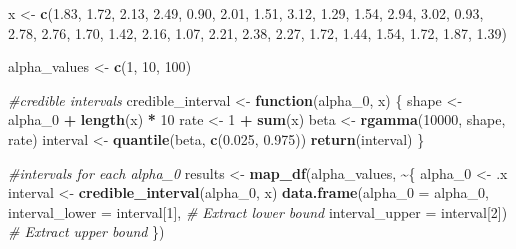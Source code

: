 \documentclass[
]{article}
\newenvironment{Shaded}{\begin{snugshade}}{\end{snugshade}}
\newcommand{\AttributeTok}[1]{\textcolor[rgb]{0.13,0.29,0.53}{#1}}
\newcommand{\CommentTok}[1]{\textcolor[rgb]{0.56,0.35,0.01}{\textit{#1}}}
\newcommand{\ControlFlowTok}[1]{\textcolor[rgb]{0.13,0.29,0.53}{\textbf{#1}}}
\newcommand{\DecValTok}[1]{\textcolor[rgb]{0.00,0.00,0.81}{#1}}
\newcommand{\FloatTok}[1]{\textcolor[rgb]{0.00,0.00,0.81}{#1}}
\newcommand{\FunctionTok}[1]{\textcolor[rgb]{0.13,0.29,0.53}{\textbf{#1}}}
\newcommand{\NormalTok}[1]{#1}
\newcommand{\OtherTok}[1]{\textcolor[rgb]{0.56,0.35,0.01}{#1}}
\newcommand{\SpecialCharTok}[1]{\textcolor[rgb]{0.81,0.36,0.00}{\textbf{#1}}}
\begin{document}
\begin{Shaded}
\begin{Highlighting}[]
\NormalTok{x }\OtherTok{\textless{}{-}} \FunctionTok{c}\NormalTok{(}\FloatTok{1.83}\NormalTok{, }\FloatTok{1.72}\NormalTok{, }\FloatTok{2.13}\NormalTok{, }\FloatTok{2.49}\NormalTok{, }\FloatTok{0.90}\NormalTok{, }\FloatTok{2.01}\NormalTok{, }\FloatTok{1.51}\NormalTok{, }\FloatTok{3.12}\NormalTok{, }\FloatTok{1.29}\NormalTok{, }\FloatTok{1.54}\NormalTok{,}
       \FloatTok{2.94}\NormalTok{, }\FloatTok{3.02}\NormalTok{, }\FloatTok{0.93}\NormalTok{, }\FloatTok{2.78}\NormalTok{, }\FloatTok{2.76}\NormalTok{, }\FloatTok{1.70}\NormalTok{, }\FloatTok{1.42}\NormalTok{, }\FloatTok{2.16}\NormalTok{, }\FloatTok{1.07}\NormalTok{, }\FloatTok{2.21}\NormalTok{,}
       \FloatTok{2.38}\NormalTok{, }\FloatTok{2.27}\NormalTok{, }\FloatTok{1.72}\NormalTok{, }\FloatTok{1.44}\NormalTok{, }\FloatTok{1.54}\NormalTok{, }\FloatTok{1.72}\NormalTok{, }\FloatTok{1.87}\NormalTok{, }\FloatTok{1.39}\NormalTok{)}

\NormalTok{alpha\_values }\OtherTok{\textless{}{-}} \FunctionTok{c}\NormalTok{(}\DecValTok{1}\NormalTok{, }\DecValTok{10}\NormalTok{, }\DecValTok{100}\NormalTok{)}

\CommentTok{\#credible intervals}
\NormalTok{credible\_interval }\OtherTok{\textless{}{-}} \ControlFlowTok{function}\NormalTok{(alpha\_0, x) \{}
\NormalTok{  shape }\OtherTok{\textless{}{-}}\NormalTok{ alpha\_0 }\SpecialCharTok{+} \FunctionTok{length}\NormalTok{(x) }\SpecialCharTok{*} \DecValTok{10}
\NormalTok{  rate }\OtherTok{\textless{}{-}} \DecValTok{1} \SpecialCharTok{+} \FunctionTok{sum}\NormalTok{(x)}
\NormalTok{  beta }\OtherTok{\textless{}{-}} \FunctionTok{rgamma}\NormalTok{(}\DecValTok{10000}\NormalTok{, shape, rate)}
\NormalTok{  interval }\OtherTok{\textless{}{-}} \FunctionTok{quantile}\NormalTok{(beta, }\FunctionTok{c}\NormalTok{(}\FloatTok{0.025}\NormalTok{, }\FloatTok{0.975}\NormalTok{))}
  \FunctionTok{return}\NormalTok{(interval)}
\NormalTok{\}}

\CommentTok{\#intervals for each alpha\_0}
\NormalTok{results }\OtherTok{\textless{}{-}} \FunctionTok{map\_df}\NormalTok{(alpha\_values, }\SpecialCharTok{\textasciitilde{}}\NormalTok{\{}
\NormalTok{  alpha\_0 }\OtherTok{\textless{}{-}}\NormalTok{ .x}
\NormalTok{  interval }\OtherTok{\textless{}{-}} \FunctionTok{credible\_interval}\NormalTok{(alpha\_0, x)}
  \FunctionTok{data.frame}\NormalTok{(}\AttributeTok{alpha\_0 =}\NormalTok{ alpha\_0, }
             \AttributeTok{interval\_lower =}\NormalTok{ interval[}\DecValTok{1}\NormalTok{],  }\CommentTok{\# Extract lower bound}
             \AttributeTok{interval\_upper =}\NormalTok{ interval[}\DecValTok{2}\NormalTok{])  }\CommentTok{\# Extract upper bound}
\NormalTok{\})}


\end{Highlighting}
\end{Shaded}
\end{document}

